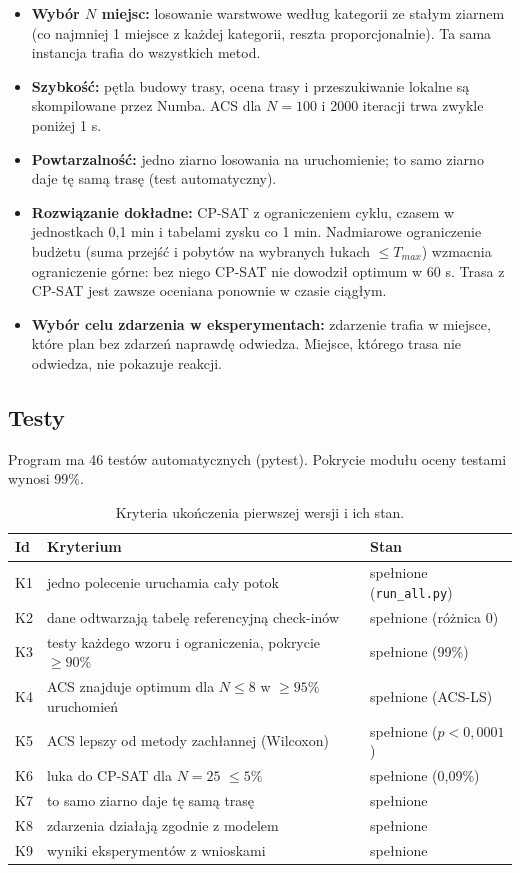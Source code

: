 \documentclass[11pt,a4paper]{article}
\begin{document}
\begin{itemize}
  \item \textbf{Wybór $N$ miejsc:} losowanie warstwowe według kategorii ze stałym ziarnem (co najmniej 1 miejsce z każdej kategorii, reszta proporcjonalnie). Ta sama instancja trafia do wszystkich metod.
  \item \textbf{Szybkość:} pętla budowy trasy, ocena trasy i przeszukiwanie lokalne są skompilowane przez Numba. ACS dla $N = 100$ i 2000 iteracji trwa zwykle poniżej 1 s.
  \item \textbf{Powtarzalność:} jedno ziarno losowania na uruchomienie; to samo ziarno daje tę samą trasę (test automatyczny).
  \item \textbf{Rozwiązanie dokładne:} CP-SAT z ograniczeniem cyklu, czasem w jednostkach 0,1 min i tabelami zysku co 1 min. Nadmiarowe ograniczenie budżetu (suma przejść i pobytów na wybranych łukach $\leq T_{max}$) wzmacnia ograniczenie górne: bez niego CP-SAT nie dowodził optimum w 60 s. Trasa z CP-SAT jest zawsze oceniana ponownie w czasie ciągłym.
  \item \textbf{Wybór celu zdarzenia w eksperymentach:} zdarzenie trafia w miejsce, które plan bez zdarzeń naprawdę odwiedza. Miejsce, którego trasa nie odwiedza, nie pokazuje reakcji.
\end{itemize}

\subsection{Testy}

Program ma 46 testów automatycznych (pytest). Pokrycie modułu oceny testami wynosi 99\%.

\begin{table}[h]
\centering
\caption{Kryteria ukończenia pierwszej wersji i ich stan.}
\begin{tabular}{lll}
\toprule
Id & Kryterium & Stan \\
\midrule
K1 & jedno polecenie uruchamia cały potok & spełnione (\texttt{run\_all.py}) \\
K2 & dane odtwarzają tabelę referencyjną check-inów & spełnione (różnica 0) \\
K3 & testy każdego wzoru i ograniczenia, pokrycie $\geq 90\%$ & spełnione (99\%) \\
K4 & ACS znajduje optimum dla $N \leq 8$ w $\geq 95\%$ uruchomień & spełnione (ACS-LS) \\
K5 & ACS lepszy od metody zachłannej (Wilcoxon) & spełnione ($p < 0{,}0001$) \\
K6 & luka do CP-SAT dla $N = 25$ $\leq 5\%$ & spełnione (0,09\%) \\
K7 & to samo ziarno daje tę samą trasę & spełnione \\
K8 & zdarzenia działają zgodnie z modelem & spełnione \\
K9 & wyniki eksperymentów z wnioskami & spełnione \\
\bottomrule
\end{tabular}
\end{table}
\end{document}
